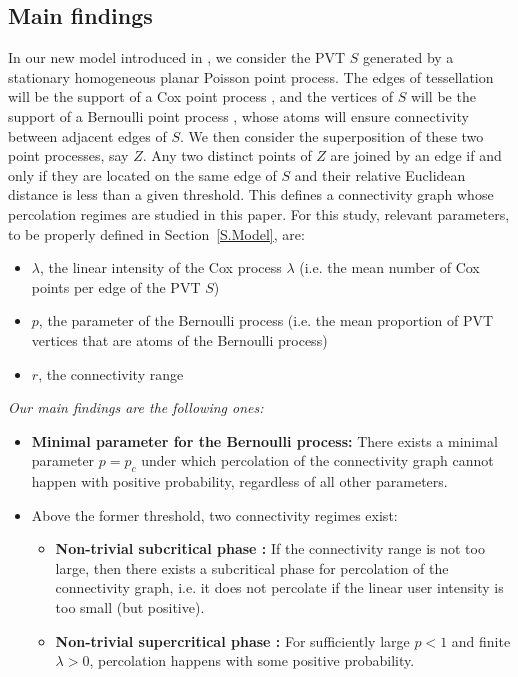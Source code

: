 \documentclass[10pt,a4paper]{amsart}
\theoremstyle{exampstyle}
\theoremstyle{exampnotations}
\begin{document}
\subsection{Main findings} In our new model introduced in \cite{LeGal1904:Influence}, we consider the PVT $S$ generated by a stationary homogeneous planar Poisson point process. The edges of tessellation will be the support of a Cox point process \cite[Section 5.2]{chiu_stochastic_2013}, and the vertices of $S$ will be the support of a Bernoulli point process \cite[Section 2.2]{chiu_stochastic_2013}, whose atoms will ensure connectivity between adjacent edges of $S$. We then consider the superposition of these two point processes, say $Z$. Any two distinct points of $Z$ are joined by an edge if and only if they are located on the same edge of $S$ and their relative Euclidean distance is less than a given threshold. This defines a connectivity graph whose percolation regimes are studied in this paper. For this study, relevant parameters, to be properly defined in Section~\ref{S.Model}, are:
\begin{itemize}
    \item $\lambda$, the linear intensity of the Cox process $\lambda$ (i.e. the mean number of Cox points per edge of the PVT $S$)
    \item $p$, the parameter of the Bernoulli process (i.e. the mean proportion of PVT vertices that are atoms of the Bernoulli process)
    \item $r$, the connectivity range
\end{itemize}
\indent \emph{Our main findings are the following ones:}
\begin{itemize}
    \item \textbf{Minimal parameter for the Bernoulli process:} There exists a minimal parameter $p=p_c$ under which percolation of the connectivity graph cannot happen with positive probability, regardless of all other parameters.
    \item Above the former threshold, two connectivity regimes exist:
    \begin{itemize}
        \item \textbf{Non-trivial subcritical phase :} If the connectivity range is not too large, then there exists a subcritical phase for percolation of the connectivity graph, i.e. it does not percolate if the linear user intensity is too small (but positive).
        \item \textbf{Non-trivial supercritical phase :} For sufficiently large $p<1$ and finite $\lambda >0$, percolation happens with some positive probability.
    \end{itemize}
\end{itemize}
\end{document}
